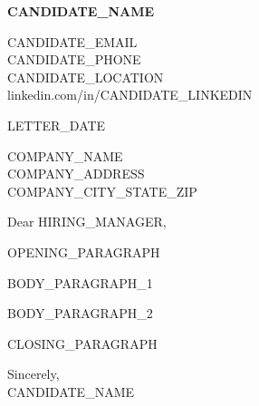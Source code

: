 \documentclass[letterpaper,11pt]{article}
\newcommand{\letterhead}[1]{
    \begin{center}
        \textbf{\Large #1}
    \end{center}
}
\begin{document}
\letterhead{{{CANDIDATE_NAME}}}

\begin{flushleft}
{{CANDIDATE_EMAIL}} \\
{{CANDIDATE_PHONE}} \\
{{CANDIDATE_LOCATION}} \\
linkedin.com/in/{{CANDIDATE_LINKEDIN}}
\end{flushleft}

\begin{flushleft}
{{LETTER_DATE}}
\end{flushleft}

\begin{flushleft}
{{COMPANY_NAME}} \\
{{COMPANY_ADDRESS}} \\
{{COMPANY_CITY_STATE_ZIP}}
\end{flushleft}

\begin{flushleft}
Dear {{HIRING_MANAGER}},
\end{flushleft}

\vspace{0.5cm}

{{OPENING_PARAGRAPH}}

\vspace{0.3cm}

{{BODY_PARAGRAPH_1}}

\vspace{0.3cm}

{{BODY_PARAGRAPH_2}}

\vspace{0.3cm}

{{CLOSING_PARAGRAPH}}

\vspace{0.5cm}

\begin{flushleft}
Sincerely, \\
{{CANDIDATE_NAME}}
\end{flushleft}

\end{document}
